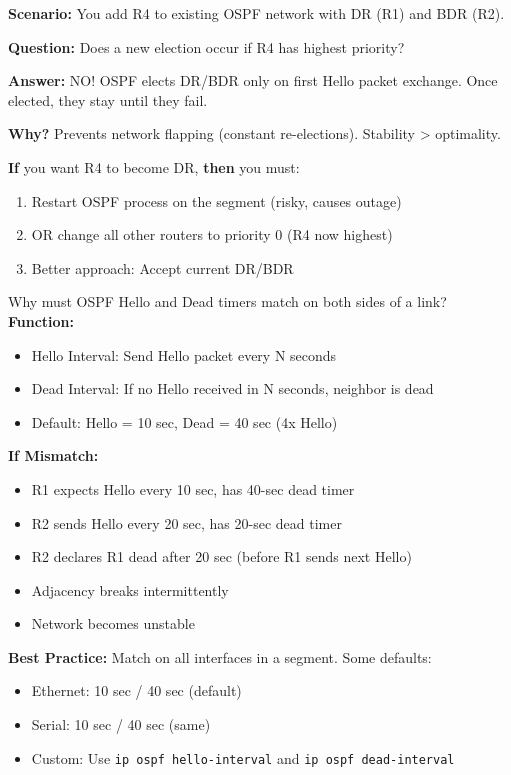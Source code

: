 \documentclass[12pt,a4paper]{article}
\begin{document}

\begin{condbox}
\textbf{Scenario:} You add R4 to existing OSPF network with DR (R1) and BDR (R2). 

\textbf{Question:} Does a new election occur if R4 has highest priority?

\textbf{Answer:} NO! OSPF elects DR/BDR only on first Hello packet exchange. Once elected, they stay until they fail.

\textbf{Why?} Prevents network flapping (constant re-elections). Stability > optimality.

\textbf{If} you want R4 to become DR, \textbf{then} you must:
\begin{enumerate}
    \item Restart OSPF process on the segment (risky, causes outage)
    \item OR change all other routers to priority 0 (R4 now highest)
    \item Better approach: Accept current DR/BDR
\end{enumerate}
\end{condbox}


\begin{whenwhybox}{Why must OSPF Hello and Dead timers match on both sides of a link?}
\textbf{Function:}
\begin{itemize}
    \item Hello Interval: Send Hello packet every N seconds
    \item Dead Interval: If no Hello received in N seconds, neighbor is dead
    \item Default: Hello = 10 sec, Dead = 40 sec (4x Hello)
\end{itemize}

\textbf{If Mismatch:}
\begin{itemize}
    \item R1 expects Hello every 10 sec, has 40-sec dead timer
    \item R2 sends Hello every 20 sec, has 20-sec dead timer
    \item R2 declares R1 dead after 20 sec (before R1 sends next Hello)
    \item Adjacency breaks intermittently
    \item Network becomes unstable
\end{itemize}

\textbf{Best Practice:} Match on all interfaces in a segment. Some defaults:
\begin{itemize}
    \item Ethernet: 10 sec / 40 sec (default)
    \item Serial: 10 sec / 40 sec (same)
    \item Custom: Use \texttt{ip ospf hello-interval} and \texttt{ip ospf dead-interval}
\end{itemize}
\end{whenwhybox}
\end{document}
